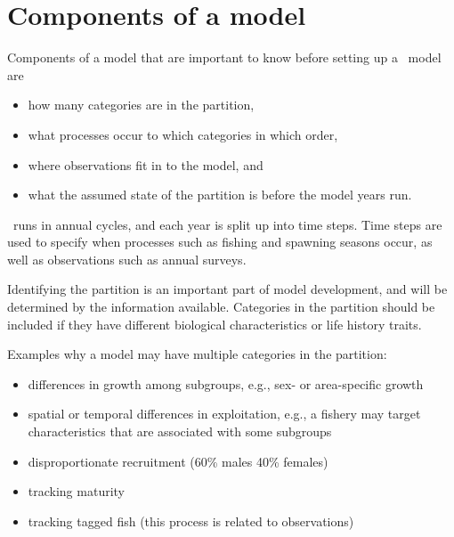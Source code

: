\section{Components of a model}\label{Sec:comp}

Components of a model that are important to know before setting up a \CNAME\ model are

\begin{itemize}
	\item how many categories are in the partition,
	\item what processes occur to which categories in which order,
	\item where observations fit in to the model, and
	\item what the assumed state of the partition is before the model years run.
\end{itemize}

\CNAME\ runs in annual cycles, and each year is split up into time steps. Time steps are used to specify when processes such as fishing and spawning seasons occur, as well as observations such as annual surveys.

Identifying the partition is an important part of model development, and will be determined by the information available. Categories in the partition should be included if they have different biological characteristics or life history traits.

Examples why a model may have multiple categories in the partition:

\begin{itemize}
	\item differences in growth among subgroups, e.g., sex- or area-specific growth
	\item spatial or temporal differences in exploitation, e.g., a fishery may target characteristics that are associated with some subgroups
	\item disproportionate recruitment (60\% males 40\% females)
	\item tracking maturity
	\item tracking tagged fish (this process is related to observations)
\end{itemize}

